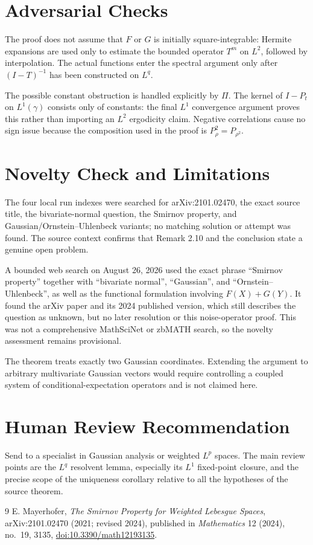 \documentclass[11pt]{article}
\newcommand{\ga}{\gamma}
\begin{document}
\section*{Adversarial Checks}

The proof does not assume that $F$ or $G$ is initially square-integrable:
Hermite expansions are used only to estimate the bounded operator $T^m$ on
$L^2$, followed by interpolation.  The actual functions enter the spectral
argument only after $(I-T)^{-1}$ has been constructed on $L^q$.

The possible constant obstruction is handled explicitly by $\Pi$.  The
kernel of $I-P_t$ on $L^1(\ga)$ consists only of constants: the final
$L^1$ convergence argument proves this rather than importing an $L^2$
ergodicity claim.  Negative correlations cause no sign issue because the
composition used in the proof is $P_\rho^2=P_{\rho^2}$.

\section*{Novelty Check and Limitations}

The four local run indexes were searched for arXiv:2101.02470, the exact
source title, the bivariate-normal question, the Smirnov property, and
Gaussian/Ornstein--Uhlenbeck variants; no matching solution or attempt was
found.  The source context confirms that Remark 2.10 and the conclusion state
a genuine open problem.

A bounded web search on August 26, 2026 used the exact phrase ``Smirnov
property'' together with ``bivariate normal'', ``Gaussian'', and
``Ornstein--Uhlenbeck'', as well as the functional formulation involving
$F(X)+G(Y)$.  It found the arXiv paper and its 2024 published version, which
still describes the question as unknown, but no later resolution or this
noise-operator proof.  This was not a comprehensive MathSciNet or zbMATH
search, so the novelty assessment remains provisional.

The theorem treats exactly two Gaussian coordinates.  Extending the argument
to arbitrary multivariate Gaussian vectors would require controlling a coupled
system of conditional-expectation operators and is not claimed here.

\section*{Human Review Recommendation}

Send to a specialist in Gaussian analysis or weighted $L^p$ spaces.  The main
review points are the $L^q$ resolvent lemma, especially its $L^1$ fixed-point
closure, and the precise scope of the uniqueness corollary relative to all the
hypotheses of the source theorem.

\begin{thebibliography}{9}
E. Mayerhofer,
\emph{The Smirnov Property for Weighted Lebesgue Spaces},
arXiv:2101.02470 (2021; revised 2024), published in
\emph{Mathematics} 12 (2024), no.~19, 3135,
\href{https://doi.org/10.3390/math12193135}{doi:10.3390/math12193135}.
\end{thebibliography}
\end{document}
